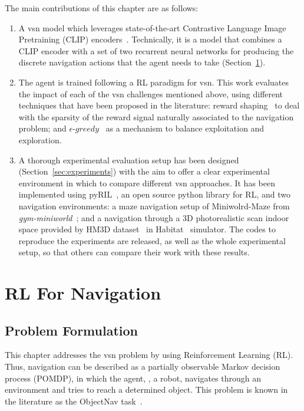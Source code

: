 The main contributions of this chapter are as follows:
\begin{enumerate}
 \item A \acrshort{vsn} model which leverages state-of-the-art Contrastive Language Image Pretraining (CLIP) encoders~\cite{radford2021}.
Technically, it is a model that combines a CLIP encoder with a set of two recurrent neural networks for producing the discrete navigation actions that the agent needs to take (Section~\ref{sec:navigation}).
  \item The agent is trained following a RL paradigm for \acrshort{vsn}.
 This work evaluates the impact of each of the \acrshort{vsn} challenges mentioned above, using different techniques that have been proposed in the literature: reward shaping~\cite{sutton2018, wijmans2020} to deal with the sparsity of the reward signal naturally associated to the navigation problem; and $\epsilon\text{-}greedy$~\cite{mnih2013} as a mechanism to balance exploitation and exploration.
  \item A thorough experimental evaluation setup has been designed (Section~\ref{sec:experiments}) with the aim to offer a clear experimental environment in which to compare different \acrshort{vsn} approaches.
 It has been implemented using pyRIL~\cite{pyRIL}, an open source python library for RL, and two navigation environments: a maze navigation setup of Miniwolrd-Maze from \textit{gym-miniworld}~\cite{gym_miniworld}; and a navigation through a 3D photorealistic scan indoor space provided by HM3D dataset~\cite{ramakrishnan2021} in Habitat~\cite{szot2021} simulator.
 The codes to reproduce the experiments are released, as well as the whole experimental setup, so that others can compare their work with these results.
\end{enumerate}

\section{RL For Navigation}\label{sec:navigation}

\subsection{Problem Formulation}\label{subsec:problem-formulation}

This chapter addresses the \acrshort{vsn} problem by using Reinforcement Learning (RL).
Thus, navigation can be described as a partially observable Markov decision process (POMDP), in which the agent, \ie, a robot, navigates through an environment and tries to reach a determined object.
This problem is known in the literature as the ObjectNav task~\cite{batra2020}.

